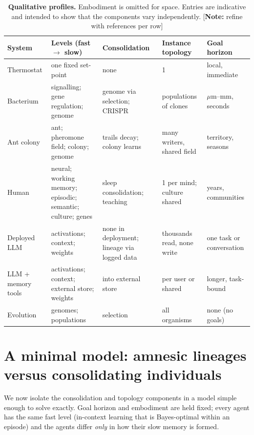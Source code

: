 \documentclass[11pt]{article}
\newcommand{\note}[1]{\textcolor{notecolor}{\small[\textbf{Note:} #1]}}
\theoremstyle{plain}
\theoremstyle{definition}
\theoremstyle{remark}
\begin{document}
\begin{table}[t]
\centering
\small
\renewcommand{\arraystretch}{1.15}
\begin{tabularx}{\linewidth}{@{}>{\raggedright}p{2.3cm}>{\raggedright}X>{\raggedright}p{2.4cm}>{\raggedright}p{2.6cm}>{\raggedright\arraybackslash}p{2.4cm}@{}}
\toprule
System & Levels (fast $\to$ slow) & Consolidation & Instance topology & Goal horizon \\
\midrule
Thermostat & one fixed set-point & none & 1 & local, immediate \\
Bacterium & signalling; gene regulation; genome & genome via selection; CRISPR & populations of clones & $\mu$m--mm, seconds \\
Ant colony & ant; pheromone field; colony; genome & trails decay; colony learns & many writers, shared field & territory, seasons \\
Human & neural; working memory; episodic; semantic; culture; genes & sleep consolidation; teaching & 1 per mind; culture shared & years, communities \\
Deployed LLM & activations; context; weights & none in deployment; lineage via logged data & thousands read, none write & one task or conversation \\
LLM + memory tools & activations; context; external store; weights & into external store & per user or shared & longer, task-bound \\
Evolution & genomes; populations & selection & all organisms & none (no goals) \\
\bottomrule
\end{tabularx}
\caption{\textbf{Qualitative profiles.} Embodiment is omitted for space. Entries are indicative and intended to show that the components vary independently. \note{refine with references per row}}
\label{tab:profiles}
\end{table}

\section{A minimal model: amnesic lineages versus consolidating individuals}
\label{sec:model}

We now isolate the consolidation and topology components in a model simple enough to solve exactly. Goal horizon and embodiment are held fixed; every agent has the same fast level (in-context learning that is Bayes-optimal within an episode) and the agents differ \emph{only} in how their slow memory is formed.
\end{document}
